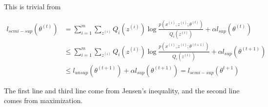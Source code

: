 \begin{answer}
    This is trivial from

$$
\begin{aligned}
l_{semi-sup}(\theta^{(t)}) &= \sum_{i=1}^m  \sum_{z^{(i)}}Q_{i}(z^{(i)})\log\frac{p(x^{(i)}, z^{(i)}; \theta^{(t)})}{Q_i(z^{(i)})} +\alpha l_{sup}(\theta^{(t)})\\
&\le  \sum_{i=1}^m  \sum_{z^{(i)}}Q_{i}(z^{(i)})\log\frac{p(x^{(i)}, z^{(i)}; \theta^{(t + 1)})}{Q_i(z^{(i)})}+ \alpha l_{sup}(\theta^{(t + 1)})\\
&\le l_{unsup}(\theta^{(t + 1)}) + \alpha l_{sup}(\theta^{(t + 1)})
= l_{semi-sup}(\theta^{t+1})
\end{aligned}
$$

The first line and third line come from Jensen's inequality, and the second line comes from maximization.
 \end{answer}
